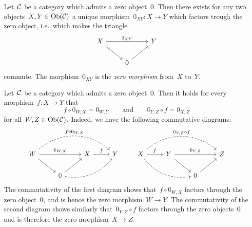 \begin{remarkdefinition}
  Let~$\mathcal{C}$ be a category which admits a zero object~$0$.
  Then there exists for any two objects~$X, Y \in \operatorname{Ob}(\mathcal{C})$ a unique morphism~$0_{XY} \colon X \to Y$ which factors trough the zero object, i.e.\ which makes the triangle
  \[
    \begin{tikzcd}
        X
        \arrow{dr}
        \arrow{rr}[above]{0_{XY}}
      & {}
      & Y
      \\
        {}
      & 0
        \arrow{ur}
      & {}
    \end{tikzcd}
  \]
  commute.
  The morphism~$0_{XY}$ is the \emph{zero morphism} from~$X$ to~$Y$.
\end{remarkdefinition}


\begin{remark*}
  Let~$\mathcal{C}$ be a category which admits a zero object~$0$.
  Then it holds for every morphism~$f \colon X \to Y$ that
  \[
      f \circ 0_{W,X}
    = 0_{W,Y}
    \qquad\text{and}\qquad
      0_{Y,Z} \circ f
    = 0_{X,Z}
  \]
  for all~$W, Z \in \operatorname{Ob}(\mathcal{C})$.
  Indeed, we have the following commutative diagrams:
  \[
    \begin{tikzcd}
        W
        \arrow[dashed, bend left = 40]{rrr}[above]{f \circ 0_{W,X}}
        \arrow{rr}[above]{0_{W,X}}
        \arrow{dr}
      & {}
      & X
        \arrow{r}[above]{f}
      & Y
      \\
        {}
      & 0
        \arrow{ur}
        \arrow[dashed, bend right]{urr}
      & {}
      & {}
    \end{tikzcd}
    \qquad
    \begin{tikzcd}
        X
        \arrow[dashed, bend left = 40]{rrr}[above]{0_{Y,Z} \circ f}
        \arrow{r}[above]{f}
        \arrow[dashed, bend right]{drr}
      & Y
        \arrow{rr}[above]{0_{Y,Z}}
        \arrow{dr}
      & {}
      & Z
      \\
        {}
      & {}
      & 0
        \arrow{ur}
      & {}
    \end{tikzcd}
  \]
  The commutativity of the first diagram shows that~$f \circ 0_{W,X}$ factors through the zero object~$0$, and is hence the zero morphism~$W \to Y$.
  The commutativity of the second diagram shows similarly that~$0_{Y,Z} \circ f$ factors through the zero objects~$0$ and is therefore the zero morphism~$X \to Z$.
\end{remark*}






